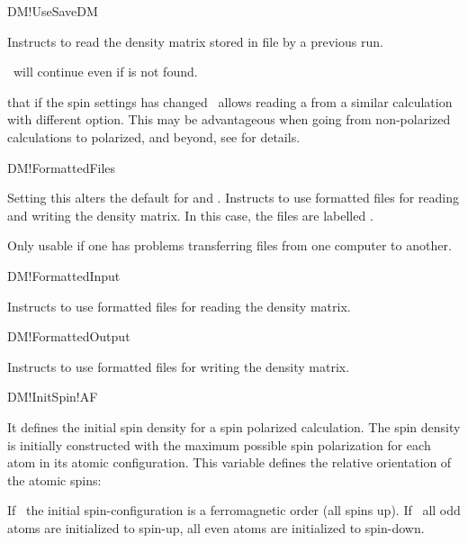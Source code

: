 \begin{fdflogicalF}{DM!UseSaveDM}
  
  Instructs to read the density matrix stored in file
   by a previous run.
  
  \siesta\ will continue even if  is not found.

  \note that if the spin settings has changed \siesta\ allows reading
  a  from a similar calculation with different 
  option. This may be advantageous when going from non-polarized
  calculations to polarized, and beyond, see  for details. 

\end{fdflogicalF}

\begin{fdflogicalF}{DM!FormattedFiles}

  Setting this alters the default for  and 
  .
  Instructs to use formatted files for reading and writing
  the density matrix. In this case, the files are labelled
  .
  
  Only usable if one has problems transferring files from one computer
  to another.

\end{fdflogicalF}

\begin{fdflogicalF}{DM!FormattedInput}

  Instructs to use formatted files for reading the density
  matrix.
  
\end{fdflogicalF}

\begin{fdflogicalF}{DM!FormattedOutput}

  Instructs to use formatted files for writing the density
  matrix.
  
\end{fdflogicalF}

\begin{fdflogicalF}{DM!InitSpin!AF}
  
  It defines the initial spin density for a spin polarized calculation.
  The spin density is initially constructed with the maximum possible
  spin polarization for each atom in its atomic configuration.
  This variable defines the relative orientation of the atomic
  spins:

  If \fdffalse\ the initial spin-configuration is a ferromagnetic
  order (all spins up).
  If \fdftrue\ all odd atoms are initialized to spin-up, all even
  atoms are initialized to spin-down.

\end{fdflogicalF}

